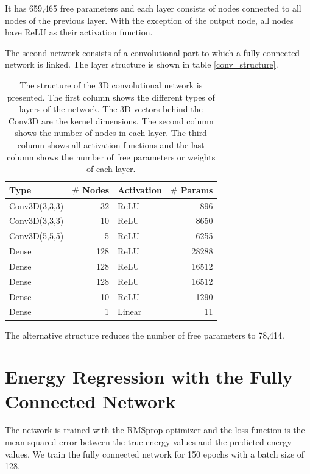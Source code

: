 \documentclass[12pt, a4paper]{thesis}
\begin{document}
It has 659,465 free parameters and each layer consists of nodes
connected to all nodes of the previous layer. With the exception of
the output node, all nodes have ReLU as their activation function.

The second network consists of a convolutional part to which a fully
connected network is linked. The layer structure is shown in table
\ref{conv_structure}.

\begin{table}[htbp]
\caption{\label{tab:org1045333}
The structure of the 3D convolutional network is presented. The first column shows the different types of layers of the network. The 3D vectors behind the Conv3D are the kernel dimensions. The second column shows the number of nodes in each layer. The third column shows all activation functions and the last column shows the number of free parameters or weights of each layer.}
\centering
\begin{tabular}{lrlr}
Type & \(\#\) Nodes & Activation & \(\#\) Params\\
\hline
Conv3D(3,3,3) & 32 & ReLU & 896\\
Conv3D(3,3,3) & 10 & ReLU & 8650\\
Conv3D(5,5,5) & 5 & ReLU & 6255\\
Dense & 128 & ReLU & 28288\\
Dense & 128 & ReLU & 16512\\
Dense & 128 & ReLU & 16512\\
Dense & 10 & ReLU & 1290\\
Dense & 1 & Linear & 11\\
\end{tabular}
\end{table}

The alternative structure reduces the number of free parameters to 78,414.

\section{Energy Regression with the Fully Connected Network}
\label{sec:orgdf3234b}

The network is trained with the RMSprop optimizer and the loss function is the
mean squared error between the true energy values and the predicted energy
values. We train the fully connected network for 150 epochs with a batch size
of 128.
\end{document}
